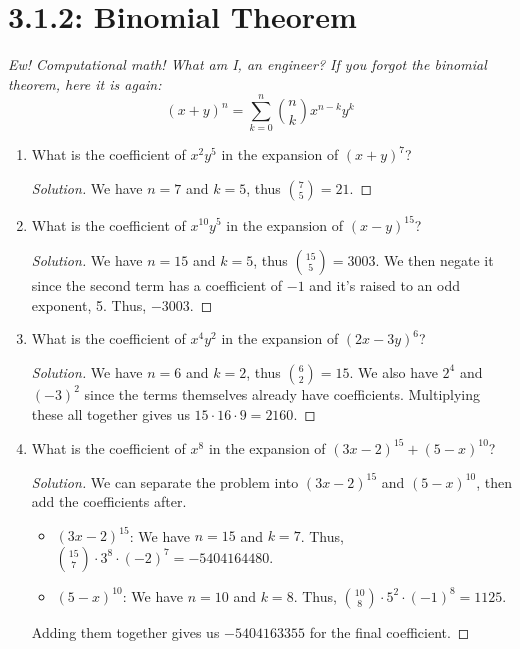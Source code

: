 \documentclass{article}
\newenvironment{solution}
  {\renewcommand\qedsymbol{$\blacksquare$}\begin{proof}[Solution]}
  {\end{proof}}
\begin{document}
\section*{3.1.2: Binomial Theorem} 
\textit{Ew! Computational math! What am I, an engineer? If you forgot the binomial theorem, here it is again:}
\[{(x+y)}^n = \sum_{k=0}^n \binom{n}{k} x^{n-k} y^k\]
\begin{enumerate} 
    \item What is the coefficient of $x^2 y^5$ in the expansion of ${(x+y)}^7$?\begin{solution} 
        We have $n=7$ and $k=5$, thus $\binom{7}{5} = 21$.
    \end{solution}
    \item What is the coefficient of $x^{10} y^5$ in the expansion of ${(x-y)}^{15}$?\begin{solution} 
        We have $n=15$ and $k=5$, thus $\binom{15}{5} = 3003$. We then negate it since the second term has a coefficient of $-1$ and it's raised to an odd exponent, 5. Thus, $-3003$. 
    \end{solution} 
    \item What is the coefficient of $x^{4} y^2$ in the expansion of ${(2x-3y)}^6$?\begin{solution} 
        We have $n=6$ and $k=2$, thus $\binom{6}{2} = 15$. We also have $2^4$ and ${(-3)}^2$ since the terms themselves already have coefficients. Multiplying these all together 
        gives us $15 \cdot 16 \cdot 9 = 2160$.   
    \end{solution}
    \item What is the coefficient of $x^8$ in the expansion of ${(3x-2)}^{15} + {(5-x)}^{10}$?\begin{solution} 
        We can separate the problem into ${(3x-2)}^{15}$ and ${(5-x)}^{10}$, then add the coefficients after.\begin{itemize} 
            \item ${(3x-2)}^{15}$: We have $n = 15$ and $k = 7$. Thus, $\binom{15}{7} \cdot 3^8 \cdot {(-2)}^7 = -5404164480$. 
            \item ${(5-x)}^{10}$: We have $n =10$ and $k = 8$. Thus, $\binom{10}{8} \cdot 5^2 \cdot {(-1)}^8 = 1125$. 
        \end{itemize} Adding them together gives us $-5404163355$ for the final coefficient. 
    \end{solution}
    \begin{minipage}[t]{.14\textwidth}
        \vspace{0pt}

\end{minipage}
\end{enumerate}
\end{document}
